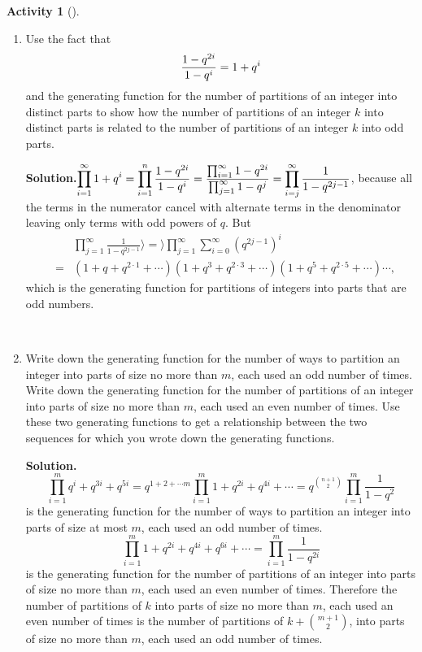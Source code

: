 \documentclass[10pt,]{book}
\theoremstyle{plain}
\theoremstyle{definition}
\newtheorem{activity}[project]{Activity}
\numberwithin{equation}{chapter}
\newcommand{\amp}{&}
\begin{document}
\begin{activity}[]\label{activity-181}
~\par
\begin{enumerate}[label=(\alph*)]
 \item Use the fact that%
\begin{equation*}
{1-q^{2i}\over 1-q^i}= 1+q^i
\end{equation*}
and the generating function for the number of partitions of an integer into distinct parts to show how the number of partitions of an integer \(k\) into distinct parts is related to the number of partitions of an integer \(k\) into odd parts.%
\par\medskip\noindent%
\textbf{Solution.}\quad \(\displaystyle\prod_{i=1}^\infty 1+q^i=\prod_{i=1}^n {1-q^{2i} \over
1-q^i}={\prod_{i=1}^\infty1-q^{2i}\over\prod_{j=1}^\infty 1-q^j}
=\prod_{i=j}^\infty \frac{1}{1-q^{2j-1}}\), because all the terms in the numerator cancel with alternate terms in the denominator leaving only terms with odd powers of \(q\). But%
\begin{align*}
\amp \amp \prod_{j=1}^\infty\frac{1}{1-q^{2j-1}}\rangle =\rangle \prod_{j=1}^\infty
\sum_{i=0}^\infty
(q^{2j-1})^i\\
\amp =\amp (1+q+q^{2\cdot1}+\cdots)(1+q^3+q^{2\cdot3}+\cdots)(1
+q^5+q^{2\cdot5}+\cdots)\cdots,
\end{align*}
which is the generating function for partitions of integers into parts that are odd numbers.%

~\par
\item Write down the generating function for the number of ways to partition an integer into parts of size no more than \(m\), each used an odd number of times. Write down the generating function for the number of partitions of an integer into parts of size no more than \(m\), each used an even number of times. Use these two generating functions to get a relationship between the two sequences for which you wrote down the generating functions.%
\par\medskip\noindent%
\textbf{Solution.}\quad %
\begin{equation*}
\displaystyle\prod_{i=1}^m q^i+q^{3i}+q^{5i}= q^{1+2+\cdots
m}\prod_{i=1}^m 1+q^{2i}+q^{4i}+\cdots=q^\binom{n+1}{2}\prod_{i=1}^m\frac{1}{1-q^2}
\end{equation*}
is the generating function for the number of ways to partition an integer into parts of size at most \(m\), each used an odd number of times.%
\begin{equation*}
\displaystyle
\prod_{i=1}^m 1 +q^{2i}+q^{4i}+q^{6i}+\cdots=\prod_{i=1}^m \frac{1}{1-q^{2i}}
\end{equation*}
is the generating function for the number of partitions of an integer into parts of size no more than \(m\), each used an even number of times. Therefore the number of partitions of \(k\) into parts of size no more than \(m\), each used an even number of times is the number of partitions of \(k+\binom{m+1}{2}\), into parts of size no more than \(m\), each used an odd number of times.%

\end{enumerate}
\end{activity}
\end{document}
